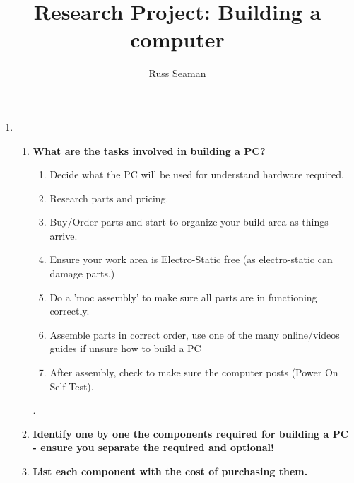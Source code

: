 \documentclass[]{article}
\title{Research Project: Building a computer}
\author{Russ Seaman}
\begin{document}
\maketitle

\begin{enumerate}
	\item 

\begin{enumerate}
	\item \textbf{What are the tasks involved in building a PC?}
				\smallskip
				\\ \begin{enumerate}
					\item Decide what the PC will be used for understand hardware required.
					\item Research parts and pricing.
					\item Buy/Order parts and start to organize your build area as things arrive.
					\item Ensure your work area is Electro-Static free (as electro-static can damage parts.)
					\item Do a 'moc assembly' to make sure all parts are in functioning correctly.
					\item Assemble parts in correct order, use one of the many online/videos guides if unsure how to build a PC
					\item After assembly, check to make sure the computer posts (Power On Self Test).
		
				\end{enumerate}.
				\medskip
	\item \textbf{Identify one by one the components required for building a PC - ensure you separate the required and optional!}
				\smallskip
				\\
				\medskip
				
	\item \textbf{List each component with the cost of purchasing them.}
				\smallskip


\end{enumerate}
\end{enumerate}
\end{document}
